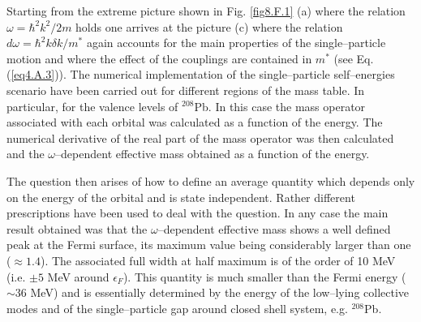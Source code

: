 \begin{subappendices}
Starting from the extreme picture shown in Fig. \ref{fig8.F.1} (a) where the relation $\omega=\hbar^2k^2/2m$ holds one arrives at the picture (c) where the relation $d\omega=\hbar^2k\delta k/m^*$ again accounts for the main properties of the single--particle motion and where the effect of the couplings are contained in $m^*$ (see Eq. (\ref{eq4.A.3})). The numerical implementation of the single--particle self--energies scenario have been carried out for different regions of the mass table. In particular, for the valence levels of $^{208}$Pb. In this case the mass operator associated with each orbital was calculated as a function of the energy. The numerical derivative of the real part of the mass operator was then calculated and the $\omega$--dependent effective mass obtained as a function of the energy.


The question then arises of how to define an average quantity which depends only on the energy of the orbital and is state independent. Rather different prescriptions have been used to deal with the question. In any case the main result obtained was that the $\omega$--dependent effective mass shows a well defined peak at the Fermi surface, its maximum value being considerably larger than one ($\approx 1.4$). The associated full width at half maximum is of the order of 10 MeV (i.e. $\pm 5$ MeV around $\epsilon_F$). This quantity is much smaller than the Fermi energy ($\sim 36$ MeV) and is essentially determined by the energy of the low--lying collective modes and of the single--particle gap around closed shell system, e.g. $^{208}$Pb.

\end{subappendices}







\renewcommand{\bibname}{Bibliography Ch 4}

%
 

